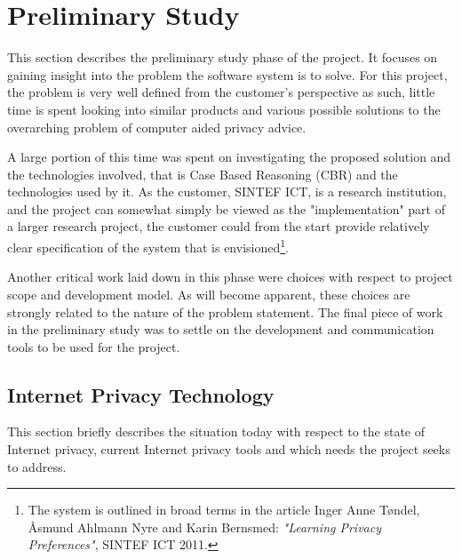 

\chapter{Preliminary Study\label{prelim}}


\minitoc

This section describes the preliminary study phase of the project. It focuses on gaining insight into the problem the software system is to solve. For this project, the problem is very well defined from the customer's perspective as such, little time is spent looking into similar products and various possible solutions to the overarching problem of computer aided privacy advice.

A large portion of this time was spent on investigating the proposed solution and the technologies involved, that is Case Based Reasoning (CBR) and the technologies used by it. As the customer, SINTEF ICT, is a research institution, and the project can somewhat simply be viewed as the "implementation" part of a larger research project, the customer could from the start provide relatively clear specification of the system that is envisioned\footnote{The system is outlined in broad terms in the article Inger Anne T{\o}ndel, {\AA}smund Ahlmann Nyre and Karin Bernsmed: \emph{"Learning Privacy Preferences"}, SINTEF ICT 2011.}. 

Another critical work laid down in this phase were choices with respect to project scope and development model. As will become apparent, these choices are strongly related to the nature of the problem statement. The final piece of work in the preliminary study was to settle on the development and communication tools to be used for the project.

\section{Internet Privacy Technology}

This section briefly describes the situation today with respect to the state of Internet privacy, current Internet privacy tools and which needs the project seeks to address.

